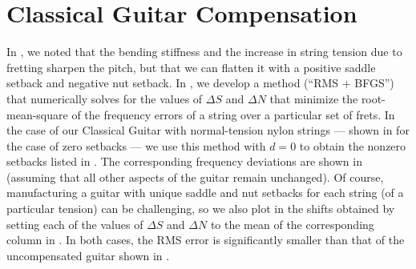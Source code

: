%
%
%

 \section{Classical Guitar Compensation\label{sct:comp}}

 In , we noted that the bending stiffness and the increase in string tension due to fretting sharpen the pitch, but that we can flatten it with a positive saddle setback and negative nut setback. In , we develop a method (``RMS + BFGS'') that numerically solves  for the values of $\Delta S$ and $\Delta N$ that minimize the root-mean-square of the frequency errors of a string over a particular set of frets. In the case of our Classical Guitar with normal-tension nylon strings --- shown in  for the case of zero setbacks --- we use this method with $d = 0$ to obtain the nonzero setbacks listed in . The corresponding frequency deviations are shown in  (assuming that all other aspects of the guitar remain unchanged). Of course, manufacturing a guitar with unique saddle and nut setbacks for each string (of a particular tension) can be challenging, so we also plot in  the shifts obtained by setting each of the values of $\Delta S$ and $\Delta N$ to the mean of the corresponding column in  . In both cases, the RMS error is significantly smaller than that of the uncompensated guitar shown in .

